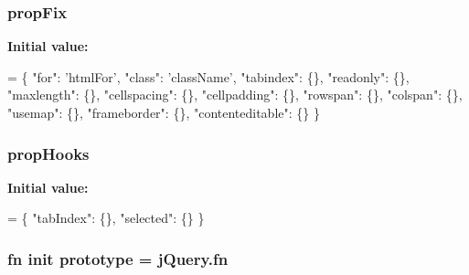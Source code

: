 \subsubsection[{prop\+Fix}]{ prop\+Fix}\label{jquery-1_810_82-vsdoc_8js_acdf840d8414190fd915ee5b9cc2fb8c5}
{\bfseries Initial value\+:}
\begin{DoxyCode}
= \{ \textcolor{stringliteral}{"for"}: \textcolor{stringliteral}{'htmlFor'},
\textcolor{stringliteral}{"class"}: \textcolor{stringliteral}{'className'},
\textcolor{stringliteral}{"tabindex"}: \{\},
\textcolor{stringliteral}{"readonly"}: \{\},
\textcolor{stringliteral}{"maxlength"}: \{\},
\textcolor{stringliteral}{"cellspacing"}: \{\},
\textcolor{stringliteral}{"cellpadding"}: \{\},
\textcolor{stringliteral}{"rowspan"}: \{\},
\textcolor{stringliteral}{"colspan"}: \{\},
\textcolor{stringliteral}{"usemap"}: \{\},
\textcolor{stringliteral}{"frameborder"}: \{\},
\textcolor{stringliteral}{"contenteditable"}: \{\} \}
\end{DoxyCode}
\hypertarget{jquery-1_810_82-vsdoc_8js_a6bf604bb8f2c26858d3e413ccebaa079}{}
\subsubsection[{prop\+Hooks}]{ prop\+Hooks}\label{jquery-1_810_82-vsdoc_8js_a6bf604bb8f2c26858d3e413ccebaa079}
{\bfseries Initial value\+:}
\begin{DoxyCode}
= \{ \textcolor{stringliteral}{"tabIndex"}: \{\},
\textcolor{stringliteral}{"selected"}: \{\} \}
\end{DoxyCode}
\hypertarget{jquery-1_810_82-vsdoc_8js_a7ef9b7a13e7ecdb967f1b98b4ada2470}{}
\subsubsection[{prototype}]{ {\bf fn} {\bf init} prototype = {\bf j\+Query.\+fn}}\label{jquery-1_810_82-vsdoc_8js_a7ef9b7a13e7ecdb967f1b98b4ada2470}
\hypertarget{jquery-1_810_82-vsdoc_8js_af0c0a2dd63f5d59bf5dea9f132dec59e}{}

